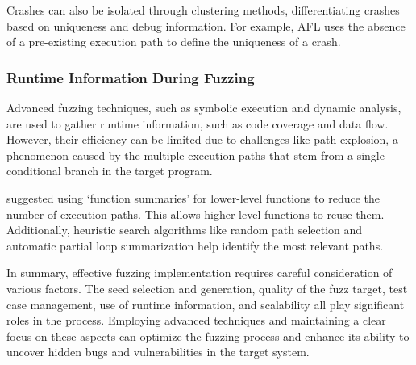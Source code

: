 Crashes can also be isolated through clustering methods, differentiating
crashes based on uniqueness and debug information. For example, AFL uses the absence
of a pre-existing execution path to define the uniqueness of a crash\cite{GitHubgo92:online}.

\subsubsection{Runtime Information During Fuzzing}

Advanced fuzzing techniques, such as symbolic execution and dynamic analysis,
are used to gather runtime information, such as code coverage and data flow.
However, their efficiency can be limited due to challenges like path explosion,
a phenomenon caused by the multiple execution paths that stem from a single
conditional branch in the target program.

 suggested using `function summaries'
for lower-level functions to reduce the number of execution paths. This allows
higher-level functions to reuse them\cite{godefroid2007compositional}. Additionally,
heuristic search algorithms like random path selection and automatic partial
loop summarization help identify the most relevant paths\cite{liang2018fuzzing}.

In summary, effective fuzzing implementation requires careful consideration of
various factors. The seed selection and generation, quality of the fuzz target,
test case management, use of runtime information, and scalability all play
significant roles in the process. Employing advanced techniques and maintaining
a clear focus on these aspects can optimize the fuzzing process and enhance its
ability to uncover hidden bugs and vulnerabilities in the target system.
\clearpage